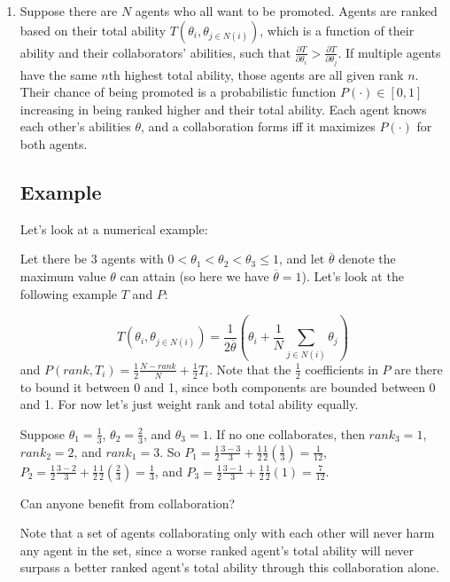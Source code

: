 \documentclass[11pt]{article}
\theoremstyle{quest}
\begin{document}
\begin{enumerate}
    \item 
    Suppose there are $N$ agents who all want to be promoted. Agents are ranked based on their total ability $T(\theta_i, \theta_{j\in N(i)})$, which is a function of their ability and their collaborators' abilities, such that $\frac{\partial T}{\partial \theta_i} > \frac{\partial T}{\partial \theta_j}$. If multiple agents have the same $n$th highest total ability, those agents are all given rank $n$.
    Their chance of being promoted is a probabilistic function $P(\cdot)\in[0,1]$ increasing in being ranked higher and their total ability. Each agent knows each other's abilities $\theta$, and a collaboration forms iff it maximizes $P(\cdot)$ for both agents. 
    \subsection{Example}
    Let's look at a numerical example:

    Let there be 3 agents with $0<\theta_1<\theta_2<\theta_3\leq1$, and let $\overline{\theta}$ denote the maximum value $\theta$ can attain (so here we have $\overline{\theta} = 1$). Let's look at the following example $T$ and $P$:
    
    \[T(\theta_i, \theta_{j\in N(i)}) = \frac{1}{2\overline{\theta}}\left(\theta_i + \frac{1}{N} \sum_{j\in N(i)}\theta_j\right)\] and $P(rank, T_i) = \frac{1}{2}\frac{N-rank}{N} + \frac{1}{2}T_i$. Note that the $\frac{1}{2}$ coefficients in $P$ are there to bound it between 0 and 1, since both components are bounded between 0 and 1. For now let's just weight rank and total ability equally.

    Suppose $\theta_1 = \frac{1}{3}$, $\theta_2 = \frac{2}{3}$, and $\theta_3 = 1$. If no one collaborates, then $rank_3 = 1$, $rank_2 = 2$, and $rank_1 = 3$. So $P_1 = \frac{1}{2}\frac{3-3}{3}+\frac{1}{2}\frac{1}{2}\left(\frac{1}{3}\right) = \frac{1}{12}$, $P_2 = \frac{1}{2}\frac{3-2}{3}+\frac{1}{2}\frac{1}{2}\left(\frac{2}{3}\right) = \frac{1}{3}$, and $P_3 = \frac{1}{2}\frac{3-1}{3}+\frac{1}{2}\frac{1}{2}(1) = \frac{7}{12}$.

    Can anyone benefit from collaboration? 

    Note that a set of agents collaborating only with each other will never harm any agent in the set, since a worse ranked agent's total ability will never surpass a better ranked agent's total ability through this collaboration alone.


\end{enumerate}
\end{document}
